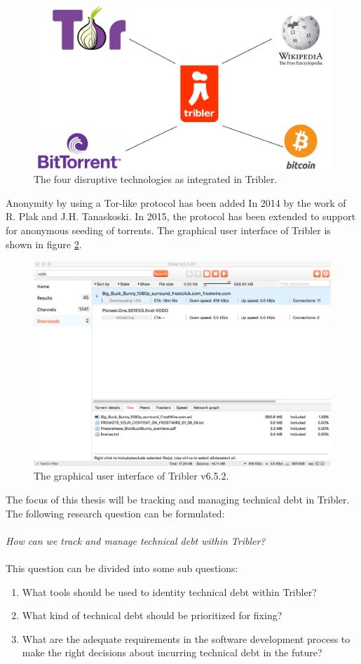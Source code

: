 \begin{figure}[!h]
	\centering
	\includegraphics[width=0.6\columnwidth]{images/introduction/tribler_connections}
	\caption{The four disruptive technologies as integrated in Tribler.}
	\label{fig:tribler-connections}
\end{figure}

Anonymity by using a Tor-like protocol has been added In 2014 by the work of R. Plak\cite{plak2014anonymous} and J.H. Tanaskoski\cite{tanaskoski2014anonymous}. 
In 2015, the protocol has been extended to support for anonymous seeding of torrents\cite{ruigrok2015bittorrent}.
The graphical user interface of Tribler is shown in figure \ref{fig:tribler-interface}.

\begin{figure}[!h]
	\centering
	\includegraphics[width=0.9\columnwidth]{images/introduction/tribler_interface}
	\caption{The graphical user interface of Tribler v6.5.2.}
	\label{fig:tribler-interface}
\end{figure}

\newpage

The focus of this thesis will be tracking and managing technical debt in Tribler. The following research question can be formulated:\\\\
\emph{How can we track and manage technical debt within Tribler?}\\\\
This question can be divided into some sub questions:
\begin{enumerate}
	\item What tools should be used to identity technical debt within Tribler?
	\item What kind of technical debt should be prioritized for fixing?
	\item What are the adequate requirements in the software development process to make the right decisions about incurring technical debt in the future?
\end{enumerate}

